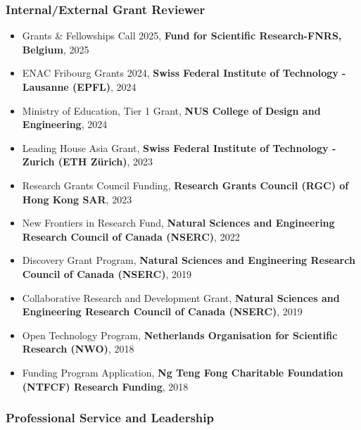 \documentclass[10pt,a4paper]{article}
\begin{document}
\begin{small}
\subsubsection*{Internal/External Grant Reviewer}
\begin{itemize}
\item
Grants \& Fellowships Call 2025, \textbf{Fund for Scientific Research-FNRS, Belgium}, 2025
\item
ENAC Fribourg Grants 2024, \textbf{Swiss Federal Institute of Technology - Lausanne (EPFL)}, 2024
\item
Ministry of Education, Tier 1 Grant, \textbf{NUS College of Design and Engineering}, 2024
\item
Leading House Asia Grant, \textbf{Swiss Federal Institute of Technology - Zurich (ETH Z\"urich)}, 2023
\item
Research Grants Council Funding, \textbf{Research Grants Council (RGC) of Hong Kong SAR}, 2023
\item
New Frontiers in Research Fund, \textbf{Natural Sciences and Engineering Research Council of Canada (NSERC)}, 2022
\item
Discovery Grant Program, \textbf{Natural Sciences and Engineering Research Council of Canada (NSERC)}, 2019
\item
Collaborative Research and Development Grant, \textbf{Natural Sciences and Engineering Research Council of Canada (NSERC)}, 2019
\item
Open Technology Program, \textbf{Netherlands Organisation for Scientific Research (NWO)}, 2018
\item
Funding Program Application, \textbf{Ng Teng Fong Charitable Foundation (NTFCF) Research Funding}, 2018
\end{itemize}


\subsubsection*{Professional Service and Leadership}


\begin{itemize}


\end{itemize}
\end{small}
\end{document}
